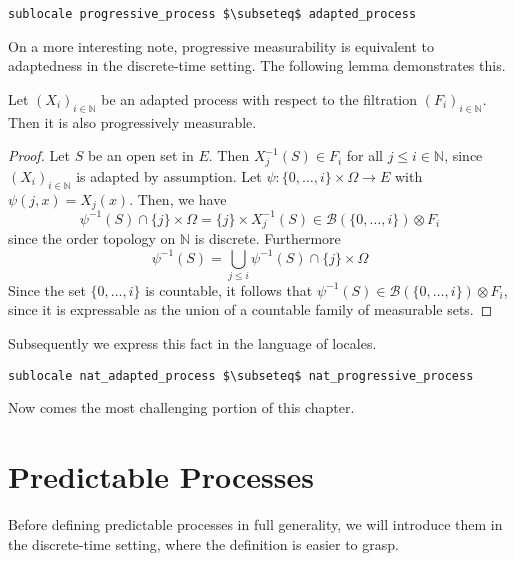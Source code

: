 \begin{isalemma}
{\small
\begin{lstlisting}[style=isabelle]
sublocale progressive_process $\subseteq$ adapted_process 
\end{lstlisting}
}
\end{isalemma}

On a more interesting note, progressive measurability is equivalent to adaptedness in the discrete-time setting. The following lemma demonstrates this.

\begin{lemma}
	Let $(X_i)_{i \in \mathbb{N}}$ be an adapted process with respect to the filtration $(F_i)_{i \in \mathbb{N}}$. Then it is also progressively measurable.
\end{lemma}
\begin{proof}
	Let $S$ be an open set in $E$. Then $X_j^{-1}(S) \in F_i$ for all $j \le i \in \mathbb{N}$, since $(X_i)_{i \in \mathbb{N}}$ is adapted by assumption. Let $\psi : \{0,\dots,i\} \times \Omega \rightarrow E$ with $\psi(j,x) = X_j(x)$. Then, we have
	\[
		\psi^{-1}(S) \cap \{j\} \times \Omega = \{j\} \times X_j^{-1}(S) \in \mathcal{B}(\{0,\dots,i\}) \otimes F_i
	\]
	since the order topology on $\mathbb{N}$ is discrete. Furthermore
	\[
		\psi^{-1}(S) = \bigcup_{j \le i} \psi^{-1}(S) \cap \{j\} \times \Omega 
	\]
	Since the set $\{0,\dots,i\}$ is countable, it follows that $\psi^{-1}(S) \in \mathcal{B}(\{0,\dots,i\}) \otimes F_i$, since it is expressable as the union of a countable family of measurable sets.
\end{proof}

Subsequently we express this fact in the language of locales.

\begin{isalemma}
{\small
\begin{lstlisting}[style=isabelle]
sublocale nat_adapted_process $\subseteq$ nat_progressive_process
\end{lstlisting}
}
\end{isalemma}

Now comes the most challenging portion of this chapter.

\section{Predictable Processes}

Before defining predictable processes in full generality, we will introduce them in the discrete-time setting, where the definition is easier to grasp.


